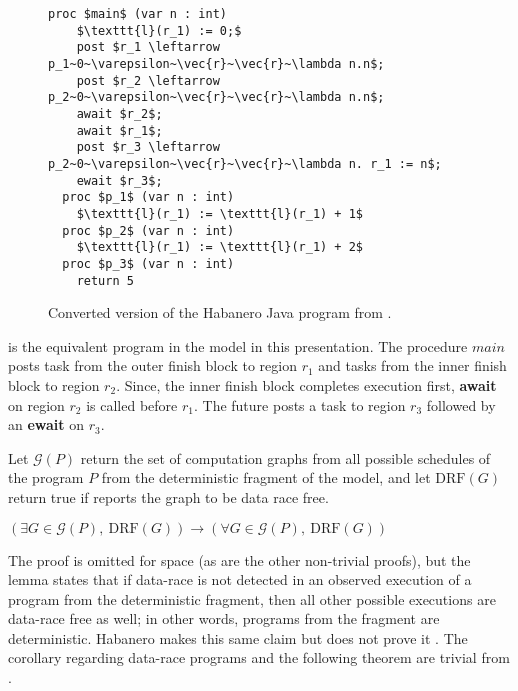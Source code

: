 \begin{figure}
  \begin{center}
\begin{lstlisting}[mathescape=true]
  proc $main$ (var n : int)
  	$\texttt{l}(r_1) := 0;$
	post $r_1 \leftarrow p_1~0~\varepsilon~\vec{r}~\vec{r}~\lambda n.n$;
	post $r_2 \leftarrow p_2~0~\varepsilon~\vec{r}~\vec{r}~\lambda n.n$;
	await $r_2$;
	await $r_1$;
	post $r_3 \leftarrow p_2~0~\varepsilon~\vec{r}~\vec{r}~\lambda n. r_1 := n$;
	ewait $r_3$;	
  proc $p_1$ (var n : int)
  	$\texttt{l}(r_1) := \texttt{l}(r_1) + 1$
  proc $p_2$ (var n : int)
  	$\texttt{l}(r_1) := \texttt{l}(r_1) + 2$
  proc $p_3$ (var n : int)
  	return 5
\end{lstlisting}
  \end{center}
    \vspace{-2em}
  \caption{Converted version of the Habanero Java program from .}
        \vspace{-1em}
  \label{fig:hj-async-fin-converted}
\end{figure}

 is the equivalent program in the model in this presentation. The procedure $main$ posts task from the outer finish block to region $r_1$ and tasks from the inner finish block to region $r_2$. Since, the inner finish block completes execution first, \textbf{await} on region $r_2$ is called before $r_1$. The future posts a task to region $r_3$ followed by an \textbf{ewait} on $r_3$.

Let $\mathcal{G}( P )$ return the set of computation graphs from all possible schedules of the program $P$ from the deterministic fragment of the model, and let $\mathrm{DRF}( G )$ return true if  reports the graph to be data race free. 

\begin{lemma} 
\label{lem:drf}
 $(\exists G \in \mathcal{G}( P ),\ \mathrm{DRF}( G )) \rightarrow (\forall G \in \mathcal{G}( P ),\ \mathrm{DRF}( G ))$ 
\end{lemma}

The proof is omitted for space (as are the other non-trivial proofs), but the lemma states that if data-race is not detected in an observed execution of a program from the deterministic fragment, then all other possible executions are data-race free as well; in other words, programs from the fragment are deterministic.
Habanero makes this same claim but does not prove it \cite{cave2011habanero}. The corollary regarding data-race programs and the following theorem are trivial from .

